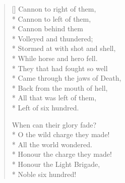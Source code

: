 \documentclass{article}
\begin{document}
\begin{verse}[\versewidth]
Cannon to right of them, \\*
Cannon to left of them, \\*
Cannon behind them \\*
\vin Volleyed and thundered; \\*
Stormed at with shot and shell, \\*
While horse and hero fell. \\*
They that had fought so well \\*
Came through the jaws of Death, \\*
Back from the mouth of hell, \\*
All that was left of them, \\*
\vin Left of six hundred. 

When can their glory fade? \\*
O the wild charge they made! \\*
\vin All the world wondered. \\*
Honour the charge they made! \\*
Honour the Light Brigade, \\*
\vin Noble six hundred!

\end{verse}

\end{document}
